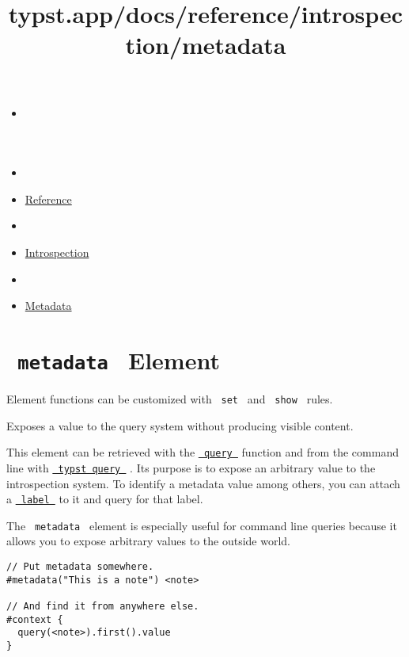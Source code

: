 \title{typst.app/docs/reference/introspection/metadata}

\begin{itemize}
\tightlist
\item
  \href{/docs}{}
\item
  
\item
  \href{/docs/reference/}{Reference}
\item
  
\item
  \href{/docs/reference/introspection/}{Introspection}
\item
  
\item
  \href{/docs/reference/introspection/metadata/}{Metadata}
\end{itemize}

\section{\texorpdfstring{\texttt{\ metadata\ } {{ Element
}}}{ metadata   Element }}\label{summary}

\label{element-tooltip}
Element functions can be customized with \texttt{\ set\ } and
\texttt{\ show\ } rules.

Exposes a value to the query system without producing visible content.

This element can be retrieved with the
\href{/docs/reference/introspection/query/}{\texttt{\ query\ }} function
and from the command line with
\href{/docs/reference/introspection/query/\#command-line-queries}{\texttt{\ typst\ query\ }}
. Its purpose is to expose an arbitrary value to the introspection
system. To identify a metadata value among others, you can attach a
\href{/docs/reference/foundations/label/}{\texttt{\ label\ }} to it and
query for that label.

The \texttt{\ metadata\ } element is especially useful for command line
queries because it allows you to expose arbitrary values to the outside
world.

\begin{verbatim}
// Put metadata somewhere.
#metadata("This is a note") <note>

// And find it from anywhere else.
#context {
  query(<note>).first().value
}
\end{verbatim}

